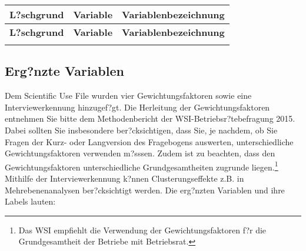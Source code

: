 \begin{longtable}{!{\color{black}\vline width 1pt} L{2.5cm} !{\color{black}\vline width 1pt} L{2.5cm} | L{11.75cm} !{\color{black}\vline width 1pt}  }
	
	\toprule
	\textbf{L?schgrund} & \textbf{Variable} & \textbf{Variablenbezeichnung}  \\ 
	\midrule
	\endfirsthead
	\toprule
		\textbf{L?schgrund} & \textbf{Variable} & \textbf{Variablenbezeichnung}  \\ 
	\midrule
	\endhead
	
	\midrule
	
	\endfoot
	\bottomrule
	\endlastfoot
		
	
	
\end{longtable}

\subsection{Erg?nzte Variablen}\label{var_ergaenzt}

Dem Scientific Use File wurden vier Gewichtungsfaktoren sowie eine Interviewerkennung hinzugef?gt. Die Herleitung der Gewichtungsfaktoren entnehmen Sie bitte dem Methodenbericht der WSI-Betriebsr?tebefragung 2015. Dabei sollten Sie insbesondere ber?cksichtigen, dass Sie, je nachdem, ob Sie Fragen der Kurz- oder Langversion des Fragebogens auswerten, unterschiedliche Gewichtungsfaktoren verwenden m?sssen. Zudem ist zu beachten, dass den Gewichtungsfaktoren unterschiedliche Grundgesamtheiten zugrunde liegen.\footnote{Das WSI empfiehlt die Verwendung der Gewichtungsfaktoren f?r die Grundgesamtheit der Betriebe mit Betriebsrat.} Mithilfe der Interviewerkennung k?nnen Clusterungseffekte z.B. in Mehrebenenanalysen ber?cksichtigt werden. Die erg?nzten Variablen und ihre Labels lauten:

